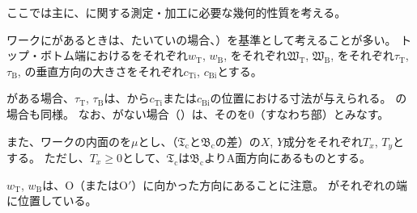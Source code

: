 

ここでは主に、\textbf{\Outcut}に関する測定・加工に必要な幾何的性質を考える。

ワークに\textbf{\Outcut}があるときは、たいていの場合、\textbf{\OutcutAsideThickness}）を基準として考えることが多い。
\expandafterindex{\yomiEndFaceID@\nameEndFaceID}トップ・ボトム端における\textbf{\nameInnerDiameter}をそれぞれ$w_\mathrm T$, $w_\mathrm B$, \textbf{\OutcutWidth}をそれぞれ$\mathfrak W_\mathrm T$, $\mathfrak W_\mathrm B$, \OutcutAsideThickness をそれぞれ$\tau_\mathrm T$, $\tau_\mathrm B$, \EndFaceInCChamfer の垂直方向の大きさをそれぞれ$c_\mathrm{Ti}$, $c_\mathrm{Bi}$とする。
\begin{hosoku}
\EndFaceInCChamfer がある場合、\OutcutAsideThickness$\tau_\mathrm T$, $\tau_\mathrm B$は、\EndFace から\EndFaceInCChamferLength$c_\mathrm{Ti}$または$c_\mathrm{Bi}$の位置における寸法が与えられる。
\EndFaceInRChamferRadius の場合も同様。
なお、\EndFaceChamfer がない場合（）は、その\EndFaceChamferLength を0（すなわち\EndFace 部）とみなす。
\end{hosoku}
また、ワークの内面の\textbf{\PlatingThk}を$\mu$とし、\textbf{\CenterlineEndFaceDif}（\TopOutcutCenter$\mathfrak T_\mathrm c$と\BottomOutcutCenter$\mathfrak B_\mathrm c$の差）の$X$, $Y$成分をそれぞれ$T_x$, $T_y$とする。
ただし、$T_x \geq 0$として、\TopOutcutCenter$\mathfrak T_\mathrm c$は\BottomOutcutCenter$\mathfrak B_\mathrm c$よりA面方向にあるものとする。
\begin{hosoku}
\InnerDiameter$w_\mathrm T$, $w_\mathrm B$は、\CurvatureCenter O（またはO$'$）に向かった方向にあることに注意。
\IDCenter がそれぞれの端に位置している。
\end{hosoku}



